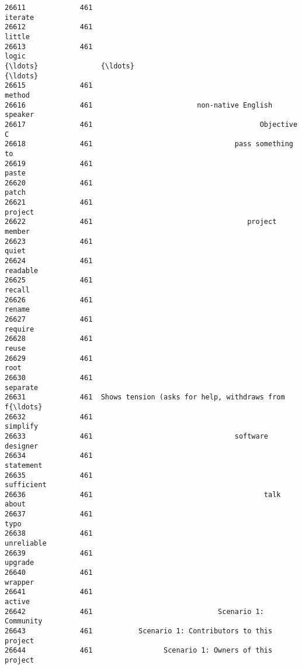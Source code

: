 \documentclass[11pt]{article}
\begin{document}
\begin{Verbatim}[commandchars=\\\{\}]
26611             461                                            iterate   
26612             461                                             little   
26613             461                                              logic   
{\ldots}               {\ldots}                                                {\ldots}   
26615             461                                             method   
26616             461                         non-native English speaker   
26617             461                                        Objective C   
26618             461                                  pass something to   
26619             461                                              paste   
26620             461                                              patch   
26621             461                                            project   
26622             461                                     project member   
26623             461                                              quiet   
26624             461                                           readable   
26625             461                                             recall   
26626             461                                             rename   
26627             461                                            require   
26628             461                                              reuse   
26629             461                                               root   
26630             461                                           separate   
26631             461  Shows tension (asks for help, withdraws from f{\ldots}   
26632             461                                           simplify   
26633             461                                  software designer   
26634             461                                          statement   
26635             461                                         sufficient   
26636             461                                         talk about   
26637             461                                               typo   
26638             461                                         unreliable   
26639             461                                            upgrade   
26640             461                                            wrapper   
26641             461                                             active   
26642             461                              Scenario 1: Community   
26643             461           Scenario 1: Contributors to this project   
26644             461                 Scenario 1: Owners of this project   


\end{Verbatim}
\end{document}
